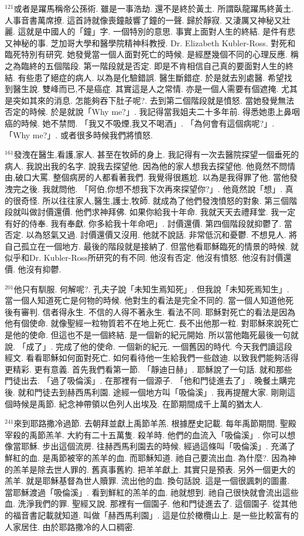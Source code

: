 \documentclass{book}
\begin{document}
$^{121}$或者是躍馬稱帝公孫術.
雖是一事浩劫.
還不是終於黃土.
所謂臥龍躍馬終黃土.
人事音書萬席撩.
這首詩就像喪鐘敲響了鐘的一聲.
歸於靜寂.
又淒厲又神秘又壯麗.
這就是中國人的「鐘」字.
一個特別的意思.
事實上面對人生的終結.
是件有悲又神秘的事.
芝加哥大學和醫學院精神科教授.
Dr. Elizabeth Kubler-Ross.
對死和臨死特別有研究.
她發覺當一個人面對死亡的時候.
是經歷幾個不同的心理反應.
稱之為臨終的五個階段.
第一階段就是否定.
即是不肯相信自己真的要面對人生的終結.
有些患了絕症的病人.
以為是化驗錯誤.
醫生斷錯症.
於是就去別處醫.
希望找到醫生說.
雙峰而已,不是癌症.
其實這是人之常情.
亦是一個人需要有個遮掩.
尤其是突如其來的消息.
怎能夠吞下肚子呢?.
去到第二個階段就是憤怒.
當她發覺無法否定的時候.
於是就說「Why me?」.
我記得當我姐夫二十多年前.
得悉她患上鼻咽癌的時候.
她不禁問.
「我又不吸煙,我又不喝酒」.
「為何會有這個病呢?」.
「Why me?」.
或者很多時候我們將憤怒.

$^{161}$發洩在醫生,看護,家人.
甚至在牧師的身上.
我記得有一次去醫院探望一個垂死的病人.
我說出我的名字.
說我去探望他.
因為他的家人想我去探望他.
他竟然不問情由,破口大罵.
整個病房的人都看著我們.
我覺得很尷尬.
以為是我得罪了他.
當他發洩完之後.
我就問他.
「阿伯,你想不想我下次再來探望你?」.
他竟然說「想」.
真的很奇怪.
所以往往家人,醫生,護士,牧師.
就成為了他們發洩憤怒的對象.
第三個階段就叫做討價還價.
他們求神拜佛.
如果你給我十年命.
我就天天去禮拜堂.
我一定有好的侍奉.
我有奉獻.
你多給我十年命吧」.
討價還價.
第四個階段就抑鬱了.
當否定.
以為怒氣又過.
討價還價又沒用.
他就不說話.
非常低沉和憂鬱.
不想見人.
將自己孤立在一個地方.
最後的階段就是接納了.
但當他看耶穌臨死的情景的時候.
就似乎和Dr. Kubler-Ross所研究的有不同.
他沒有否定.
他沒有憤怒.
他沒有討價還價.
他沒有抑鬱.

$^{201}$他只有馴服.
何解呢?.
孔夫子說「未知生焉知死」.
但我說「未知死焉知生」.
當一個人知道死亡是何物的時候.
他對生的看法是完全不同的.
當一個人知道他死後有審判.
信者得永生.
不信的人得不著永生.
看法不同.
耶穌對死亡的看法是因為他有個使命.
就像聖經一粒物質若不在地上死亡.
長不出他那一粒.
對耶穌來說死亡是他的使命.
但這也不是一個終結.
是一個新的紀元開始.
所以當他臨死最後一句就說.
「成了」.
完成了他的使命.
一個新的紀元.
一個舊因的時代.
今天我們讀這段經文.
看看耶穌如何面對死亡.
如何看待他一生給我們一些啟迪.
以致我們能夠活得更精彩.
更有意義.
首先我們看第一節.
「靜迪日赫」.
耶穌說了一句話.
就和那些門徒出去.
「過了吸倫溪」.
在那裡有一個源子.
「他和門徒進去了」.
晚餐土購完後.
就和門徒去到赫西馬利園.
途經一個地方叫「吸倫溪」.
我再提醒大家.
剛剛這個時候是禹節.
紀念神帶領以色列人出埃及.
在節期間成千上萬的猶太人.

$^{241}$來到耶路撒冷過節.
去朝拜並獻上禹節羊羔.
根據歷史記載.
每年禹節期間.
聖殿宰殺的禹節羔羊.
大約有二十五萬隻.
殺羊時.
他們的血流入「吸倫溪」.
你可以想像當耶穌.
步出這個流房.
往赫西馬利園去的時候.
經過這條叫「吸倫溪」.
充滿了鮮紅的血.
是禹節被宰的羔羊的血.
而耶穌知道.
祂自己要流出血.
為什麼?.
因為神的羔羊是除去世人罪的.
舊真事舊約.
把羊羊獻上.
其實只是預表.
另外一個更大的羔羊.
就是耶穌基督為世人贖罪.
流出他的血.
換句話說.
這是一個很諷刺的圖畫.
當耶穌渡過「吸倫溪」.
看到鮮紅的羔羊的血.
祂就想到.
祂自己很快就會流出這些血.
洗淨我們的罪.
聖經又說.
那裡有一個園子.
他和門徒進去了.
這個園子.
從其他的福音書記載就知道.
叫做「赫西馬利園」.
這是位於橄欖山上.
是一些比較富有的人家居住.
由於耶路撒冷的人口稠密.
\end{document}
